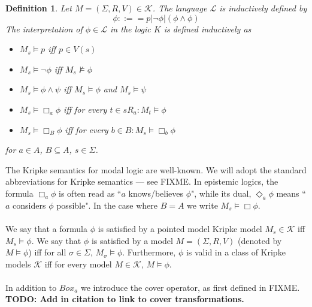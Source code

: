 \documentclass[12pt, a4paper, titlepage]{scrartcl}
\newtheorem{defn}{Definition}[section]
\numberwithin{equation}{section}
\newcommand{\lang}{\mathcal{L}}
\newcommand{\kripkeClass}{\mathcal{K}}
\begin{document}
\begin{defn} \label{modalLogic}
Let $M = (\Sigma, R, V) \in \kripkeClass$.
The language $\lang$ is inductively defined by
\[
	\phi ::== p | \neg \phi | (\phi \land \phi)
\]
The interpretation of $\phi \in \lang$ in the logic $K$ is defined inductively as
\begin{itemize}
	\item $M_s \models p$ iff $p \in V(s)$
	\item $M_s \models \neg \phi$ iff $M_s \not \models \phi$
	\item $M_s \models \phi \land \psi$ iff $M_s \models \phi$ and $M_s \models \psi$
	\item $M_s \models \Box_a \phi$ iff for every $t \in s R_a: M_t \models \phi$
	\item $M_s \models \Box_B \phi$ iff for every $b \in B : M_s \models \Box_b \phi$
\end{itemize}
for $a \in A$, $B \subseteq A$, $s \in \Sigma$.
\end{defn}
The Kripke semantics for modal logic are well-known.
We will adopt the standard abbreviations for Kripke semantics --- see FIXME.
In epistemic logics, the formula $\Box_a \phi$ is often read as ``$a$ knows/believes $\phi$", while
its dual, $\Diamond_a \phi$ means ``$a$ considers $\phi$ possible".
In the case where $B = A$ we write $M_s \models \Box \phi$.\\
\\
We say that a formula $\phi$ is satisfied by a pointed model Kripke model $M_s \in \kripkeClass$ iff
$M_s \models \phi$.
We say that $\phi$ is satisfied by a model $M = (\Sigma, R, V)$ (denoted by $M \models \phi$) iff
for all $\sigma \in \Sigma$, $M_\sigma \models \phi$.
Furthermore, $\phi$ is valid in a class of Kripke models $\kripkeClass$ iff for every model $M \in
\kripkeClass$, $M \models \phi$.\\
\\
In addition to $Box_a$ we introduce the cover operator, as first defined in FIXME.
{\bf TODO: Add in citation to link to cover transformations. }
\end{document}
